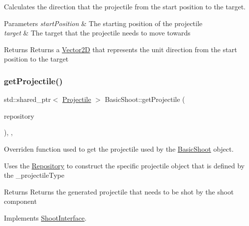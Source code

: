 Calculates the direction that the projectile from the start position to the target. 


\begin{DoxyParams}{Parameters}
{\em start\+Position} & The starting position of the projectile \\
\hline
{\em target} & The target that the projectile needs to move towards \\
\hline
\end{DoxyParams}
\begin{DoxyReturn}{Returns}
Returns a \hyperlink{class_vector2_d}{Vector2D} that represents the unit direction from the start position to the target 
\end{DoxyReturn}
\mbox{\label{class_basic_shoot_a2cad5133e2bcdc6441551387b3f2e873}} 
\subsubsection{\texorpdfstring{get\+Projectile()}{getProjectile()}}
{\footnotesize\ttfamily std\+::shared\+\_\+ptr$<$ \hyperlink{class_projectile}{Projectile} $>$ Basic\+Shoot\+::get\+Projectile (\begin{DoxyParamCaption}\item[{const std\+::shared\+\_\+ptr$<$ \hyperlink{class_repositiory_interface}{Repositiory\+Interface} $>$}]{repository }\end{DoxyParamCaption})\hspace{0.3cm}{\ttfamily [override]}, {\ttfamily [protected]}, {\ttfamily [virtual]}}



Overriden function used to get the projectile used by the \hyperlink{class_basic_shoot}{Basic\+Shoot} object. 

Uses the \hyperlink{class_repository}{Repository} to construct the specific projectile object that is defined by the \+\_\+projectile\+Type \begin{DoxyReturn}{Returns}
Returns the generated projectile that needs to be shot by the shoot component 
\end{DoxyReturn}


Implements \hyperlink{class_shoot_interface_ab93ccb6b21911e121b19dc15196a4e0b}{Shoot\+Interface}.

\mbox{\label{class_basic_shoot_a8710518507ed4fc20bef204159e05090}} 
